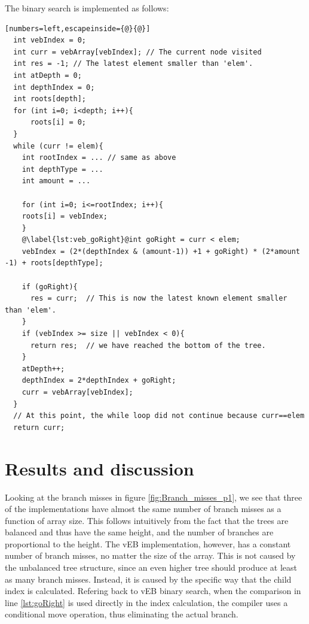 The binary search is implemented as follows:
\begin{lstlisting}[numbers=left,escapeinside={@}{@}]
  int vebIndex = 0;
  int curr = vebArray[vebIndex]; // The current node visited
  int res = -1; // The latest element smaller than 'elem'.
  int atDepth = 0;
  int depthIndex = 0;
  int roots[depth];
  for (int i=0; i<depth; i++){
      roots[i] = 0;
  }
  while (curr != elem){
    int rootIndex = ... // same as above
    int depthType = ...
    int amount = ...
    
    for (int i=0; i<=rootIndex; i++){
	roots[i] = vebIndex;
    }
    @\label{lst:veb_goRight}@int goRight = curr < elem;
    vebIndex = (2*(depthIndex & (amount-1)) +1 + goRight) * (2*amount -1) + roots[depthType];

    if (goRight){
      res = curr;  // This is now the latest known element smaller than 'elem'.
    }
    if (vebIndex >= size || vebIndex < 0){
      return res;  // we have reached the bottom of the tree.
    }
    atDepth++;
    depthIndex = 2*depthIndex + goRight;
    curr = vebArray[vebIndex];
  }
  // At this point, the while loop did not continue because curr==elem
  return curr;
\end{lstlisting}








\section{Results and discussion}

Looking at the branch misses in figure \ref{fig:Branch_misses_p1}, we see that three of the implementations have almost the same number of branch misses as a function of array size.
This follows intuitively from the fact that the trees are balanced and thus have the same height, and the number of branches are proportional to the height.
The vEB implementation, however, has a constant number of branch misses, no matter the size of the array. This is not caused by the unbalanced tree structure, since an even higher tree should produce at least as many branch misses.
Instead, it is caused by the specific way that the child index is calculated. Refering back to vEB binary search, when the comparison in line \ref{lst:goRight} is used directly in the index calculation, the compiler uses a conditional move operation, thus eliminating the actual branch.

